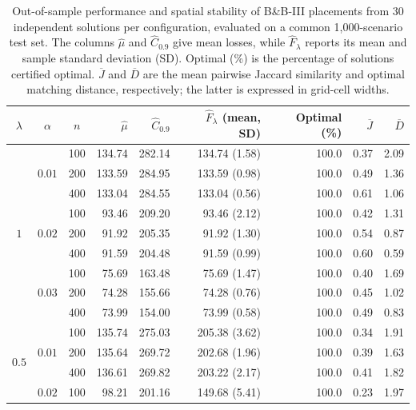 \documentclass{itor}
\begin{document}
\begin{table}[!htbp]
\centering
\caption{Out-of-sample performance and spatial stability of B\&B-III
placements from 30 independent solutions per configuration, evaluated
on a common 1,000-scenario test set. The columns $\widehat\mu$ and
$\widehat C_{0.9}$ give mean losses, while $\widehat F_\lambda$
reports its mean and sample standard deviation (SD).
Optimal (\%) is the percentage of solutions certified optimal.
$\overline J$ and $\overline D$ are the mean pairwise Jaccard
similarity and optimal matching distance, respectively;
the latter is expressed in grid-cell widths.}
\label{tab:new20-oos-stability}
\setlength{\tabcolsep}{4pt}
\renewcommand{\arraystretch}{1.07}
\begin{tabular}{@{}ccc r r r r r r@{}}
\toprule
$\lambda$ & $\alpha$ & $n$ & $\widehat\mu$ & $\widehat C_{0.9}$ & $\widehat F_\lambda$ (mean, SD) & Optimal (\%) & $\overline J$ & $\overline D$ \\
\midrule
\multirow{9}{*}{$1$} & \multirow{3}{*}{$0.01$} & 100 & 134.74 & 282.14 & 134.74 (1.58) & 100.0 & 0.37 & 2.09 \\
 &  & 200 & 133.59 & 284.95 & 133.59 (0.98) & 100.0 & 0.49 & 1.36 \\
 &  & 400 & 133.04 & 284.55 & 133.04 (0.56) & 100.0 & 0.61 & 1.06 \\
\cmidrule(l){2-9}
 & \multirow{3}{*}{$0.02$} & 100 & 93.46 & 209.20 & 93.46 (2.12) & 100.0 & 0.42 & 1.31 \\
 &  & 200 & 91.92 & 205.35 & 91.92 (1.30) & 100.0 & 0.54 & 0.87 \\
 &  & 400 & 91.59 & 204.48 & 91.59 (0.99) & 100.0 & 0.60 & 0.59 \\
\cmidrule(l){2-9}
 & \multirow{3}{*}{$0.03$} & 100 & 75.69 & 163.48 & 75.69 (1.47) & 100.0 & 0.40 & 1.69 \\
 &  & 200 & 74.28 & 155.66 & 74.28 (0.76) & 100.0 & 0.45 & 1.02 \\
 &  & 400 & 73.99 & 154.00 & 73.99 (0.58) & 100.0 & 0.49 & 0.83 \\
\midrule
\multirow{9}{*}{$0.5$} & \multirow{3}{*}{$0.01$} & 100 & 135.74 & 275.03 & 205.38 (3.62) & 100.0 & 0.34 & 1.91 \\
 &  & 200 & 135.64 & 269.72 & 202.68 (1.96) & 100.0 & 0.39 & 1.63 \\
 &  & 400 & 136.61 & 269.82 & 203.22 (2.17) & 100.0 & 0.41 & 1.82 \\
\cmidrule(l){2-9}
 & \multirow{3}{*}{$0.02$} & 100 & 98.21 & 201.16 & 149.68 (5.41) & 100.0 & 0.23 & 1.97 \\

\end{tabular}
\end{table}
\end{document}
